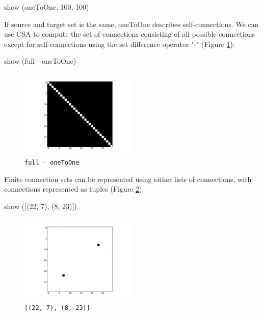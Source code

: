 \documentclass[a4paper,twoside]{report}
\newcommand{\expr}[1]{\lstinline|#1|}
\begin{document}
\begin{code}{}
  show (oneToOne, 100, 100)
\end{code}

If source and target set is the same, oneToOne describes
self-connections.  We can use CSA to compute the set of connections
consisting of all possible connections except for self-connections
using the set difference operator "-" (Figure \ref{fig:setDifference}):

\begin{code}{}
  show (full - oneToOne)
\end{code}

\begin{figure}
  \begin{center}
    \includegraphics[width=0.5\textwidth]{figures/setDifference}
    \caption[Set difference]{\label{fig:setDifference}
      \expr{full - oneToOne}
    }
  \end{center}
\end{figure}

Finite connection sets can be represented using either lists of
connections, with connections represented as tuples (Figure
\ref{fig:twoPoints}):

\begin{code}{}
  show ([(22, 7), (8, 23)])
\end{code}

\begin{figure}
  \begin{center}
    \includegraphics[width=0.5\textwidth]{figures/twoPoints}
    \caption[Mask with two connections]{\label{fig:twoPoints}
      \expr{[(22, 7), (8, 23)]}
    }
  \end{center}
\end{figure}
\end{document}
